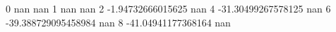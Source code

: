0 nan nan
1 nan nan
2 -1.94732666015625 nan
4 -31.30499267578125 nan
6 -39.388729095458984 nan
8 -41.04941177368164 nan
